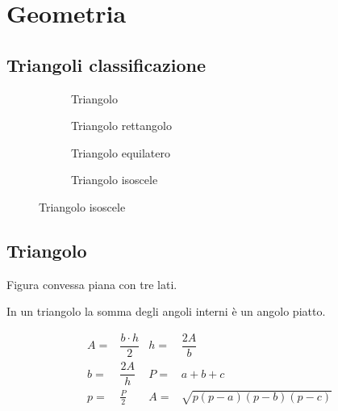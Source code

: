 \chapter{Geometria}
\section{Triangoli classificazione}
{\centering{}
\centering}

{\centering{}
\centering }

\begin{figure}
\begin{subfigure}[b]{.5\linewidth}

\caption{Triangolo}\label{sub:triangolo}
\end{subfigure}
\begin{subfigure}[b]{.5\linewidth}
	
	\caption{Triangolo rettangolo}\label{sub:triangolorettangolo}
\end{subfigure}
\begin{subfigure}[b]{.5\linewidth}
	
	\caption{Triangolo equilatero}\label{sub:triangoloequilatero}
\end{subfigure}
\begin{subfigure}[b]{.5\linewidth}

	\caption{Triangolo isoscele}\label{sub:triangoloisoscele}
\end{subfigure}
\label{fig:trianoli}
\end{figure}
\section{Triangolo}
\begin{defn}[Triangolo]
Figura convessa piana con tre lati.
\end{defn}
\begin{prop}[Triangolo]
	In un triangolo la somma degli angoli interni è un angolo piatto. 
\end{prop}
	\begin{align*}
A=&\dfrac{b\cdot h}{2}&h=&\dfrac{2A}{b}\\
b=&\dfrac{2A}{h}&P=&a+b+c\\
p=&\frac{P}{2}&	A=&\sqrt{p(p-a)(p-b)(p-c)}
\end{align*}


